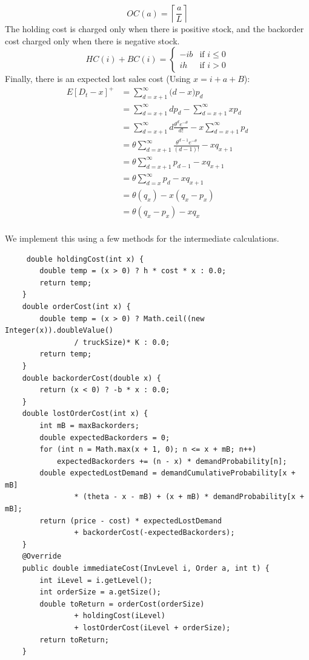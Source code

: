 \documentclass[11pt]{article}
\begin{document}
\begin{enumerate}
  \begin{equation*}
    OC(a)=\left\lceil \frac{a}{L}\right\rceil  
  \end{equation*}
  The holding cost is charged only when there is positive stock, and the backorder cost charged only when there is negative stock.
  \begin{equation*}HC(i)+BC(i)=\left\{
    \begin{array}{cc}
      -ib & \textrm{if $i \le 0$}\\
      ih & \textrm{if $i > 0$}
    \end{array} \right.
  \end{equation*}
  Finally, there is an expected lost sales cost (Using $x=i+a+B$):
    \begin{align*}
      E[D_t-x]^+ &= \sum_{d=x+1}^\infty \big(d-x\big)p_d \\
      &= \sum_{d=x+1}^\infty dp_d -\sum_{d=x+1}^\infty xp_d \\
      &= \sum_{d=x+1}^\infty d\frac{\theta^d e^{-\theta}}{d!} -x\sum_{d=x+1}^\infty p_d \\
      &= \theta\sum_{d=x+1}^\infty \frac{\theta^{d-1} e^{-\theta}}{(d-1)!} -xq_{x+1} \\
      &= \theta\sum_{d=x+1}^\infty {p_{d-1}} -xq_{x+1} \\
      &= \theta\sum_{d=x}^\infty {p_{d}} -xq_{x+1} \\
      &= \theta (q_{x}) -x(q_{x}-p_x) \\
      &= \theta (q_{x}-p_{x}) -xq_{x} \\
    \end{align*}
\end{enumerate}

We implement this using a few methods for the intermediate calculations.
  \begin{lstlisting}
     double holdingCost(int x) {
        double temp = (x > 0) ? h * cost * x : 0.0;
        return temp;
    } 
    double orderCost(int x) {
        double temp = (x > 0) ? Math.ceil((new Integer(x)).doubleValue()
                / truckSize)* K : 0.0;
        return temp;
    }  
    double backorderCost(double x) {
        return (x < 0) ? -b * x : 0.0;
    }
    double lostOrderCost(int x) {
        int mB = maxBackorders;
        double expectedBackorders = 0;
        for (int n = Math.max(x + 1, 0); n <= x + mB; n++)
            expectedBackorders += (n - x) * demandProbability[n];
        double expectedLostDemand = demandCumulativeProbability[x + mB]
                * (theta - x - mB) + (x + mB) * demandProbability[x + mB];
        return (price - cost) * expectedLostDemand
                + backorderCost(-expectedBackorders);
    }
    @Override
    public double immediateCost(InvLevel i, Order a, int t) {
        int iLevel = i.getLevel();
        int orderSize = a.getSize();
        double toReturn = orderCost(orderSize)
                + holdingCost(iLevel)
                + lostOrderCost(iLevel + orderSize);
        return toReturn;
    }
\end{lstlisting}
\end{document}
